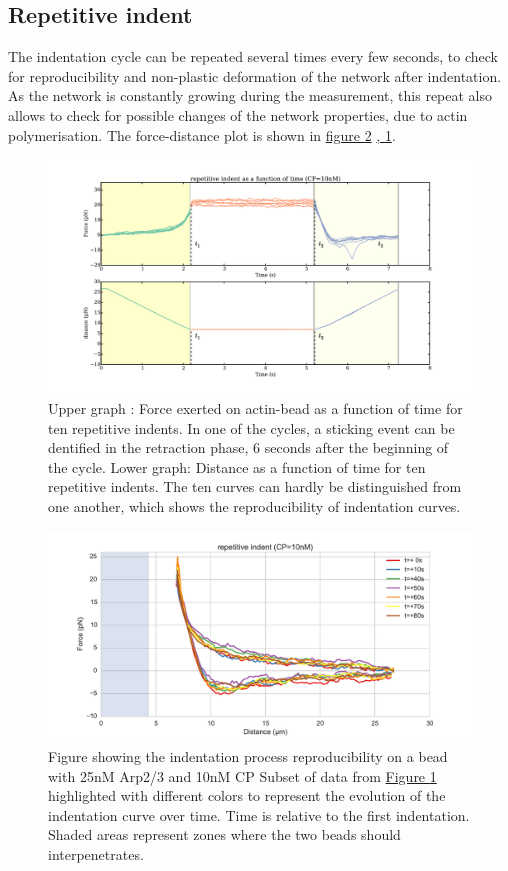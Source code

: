 \documentclass[A4paperpaper,11pt,english]{sphinxmanual}
\begin{document}
\subsection{Repetitive indent}
\label{index-latex:repetitive-indent}
The indentation cycle can be repeated several times every few seconds, to check for reproducibility and non-plastic deformation of the network after
indentation. As the network is constantly growing during the measurement, this
repeat also allows to check for possible changes of the network properties, due to actin
polymerisation. The force-distance plot is shown in \hyperref[index-latex:reproc]{figure  \ref*{index-latex:reproc}} \hyperref[index-latex:reproc-time]{,  \ref*{index-latex:reproc-time}}.
\begin{figure}[htbp]
\centering
\capstart

\includegraphics[width=1.000\linewidth]{reproc-time.pdf}
\caption{Upper graph : Force exerted on actin-bead as a function of time for ten
repetitive indents. In one of the cycles, a sticking event can be dentified in the
retraction phase, 6 seconds after the beginning of the cycle. Lower graph:
Distance as a function of time for  ten repetitive indents. The ten curves
can hardly be distinguished from one another, which shows the
reproducibility of indentation curves.}\label{index-latex:reproc-time}\end{figure}
\begin{figure}[htbp]
\centering
\capstart

\includegraphics[width=0.800\linewidth]{reproc.pdf}
\caption{Figure showing the indentation process reproducibility on a bead with
25nM Arp2/3 and 10nM CP Subset of data from \hyperref[index-latex:reproc-time]{Figure  \ref*{index-latex:reproc-time}} highlighted
with different colors to represent the evolution of the indentation curve
over time.  Time is relative to the first indentation. Shaded areas represent
zones where the two beads should  interpenetrates.}\label{index-latex:reproc}\end{figure}
\end{document}
